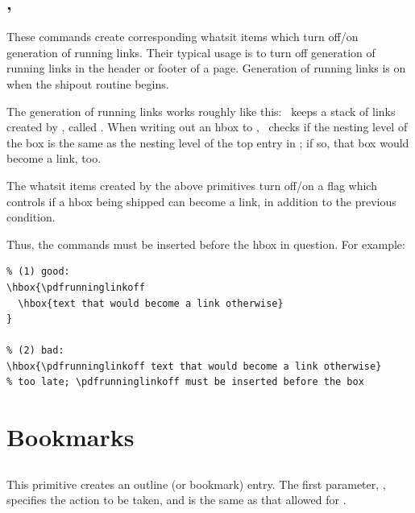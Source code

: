 \documentclass{pdftexmanual}
\begin{document}
\subsection{, }

These commands create corresponding whatsit items which turn off/on
generation of running links. Their typical usage is to turn off
generation of running links in the header or footer of a page.
Generation of running links is on when the shipout routine begins.

The generation of running links works roughly like this: \PDFTEX\ keeps
a stack of links created by , called
. When writing out an hbox to \PDF, \PDFTEX\ checks
if the nesting level of the box is the same as the nesting level of the
top entry in ; if so, that box would become a link,
too.

The whatsit items created by the above primitives turn off/on a flag
which controls if a hbox being shipped can become a link, in addition to
the previous condition.

Thus, the commands must be inserted before the hbox in question. For example:

\begin{verbatim}
% (1) good:
\hbox{\pdfrunninglinkoff
  \hbox{text that would become a link otherwise}
}

% (2) bad:
\hbox{\pdfrunninglinkoff text that would become a link otherwise} 
% too late; \pdfrunninglinkoff must be inserted before the box
\end{verbatim}

\section{Bookmarks}

\subsection{}

This primitive creates an outline (or bookmark) entry. The first
parameter, , specifies the action to be taken, and
is the same as that allowed for \type{\pdfstartlink}.
\end{document}
